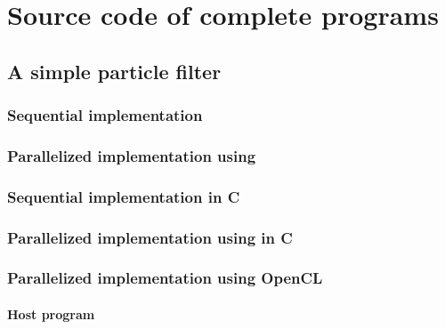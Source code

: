 \chapter{Source code of complete programs}
\label{app:chap:Source code of complete programs}

\section{A simple particle filter}
\label{app:sec:A simle particle fitler}

\subsection{Sequential implementation}
\label{app:sub:Sequential implementation}


\subsection{Parallelized implementation using \protect\tbb}
\label{app:sub:Parallelized implementation using TBB}


\subsection{Sequential implementation in C}
\label{app:sub:Sequential implementation in C}


\subsection{Parallelized implementation using \protect\tbb in C}
\label{app:sub:Parallelized implementation using TBB in C}


\subsection{Parallelized implementation using OpenCL}
\label{app:sub:Parallelized implementation using OpenCL}

\subsubsection{Host program}
\label{app:sub:Host program}

